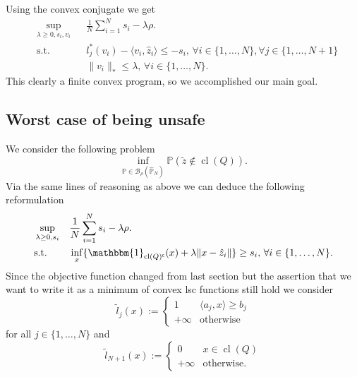\documentclass{scrartcl}
\renewcommand{\P}{\mathbb{P}}
\DeclareMathOperator*{\cl}{cl}
\newcommand{\ball}{\mathcal{B}}
\begin{document}
Using the convex conjugate we get
\begin{equation*}
  \begin{aligned}
    & \sup_{\lambda \ge 0, s_i,v_i} & & \frac{1}{N} \sum_{i=1}^N s_i - \lambda\rho. \\
    & \text{s.t.} & & l_j^*(v_i) - \langle {v_i, \hat{z}_i} \rangle \le - s_i, \, \forall i \in \{1,\dots,N\}, \forall j \in \{1,\dots,N+1\} \\
    & & & \lVert {v_i} \rVert_*\le\lambda, \, \forall i \in \{1,\dots,N\}.
  \end{aligned}
\end{equation*}
This clearly a finite convex program, so we accomplished our main goal.

\subsection*{Worst case of being unsafe}
\label{sec:unsafe}
We consider the following problem
\begin{equation}
  \label{eq:op_unsafe}
  \inf_{\P \in \ball_{\rho}(\hat{\P}_{N})} \P \left( \tilde{z} \not\in \cl(Q) \right).
\end{equation}
Via the same lines of reasoning as above we can deduce the following reformulation
\begin{equation}
  \label{eq:reform_copy}
  \begin{aligned}
    & \sup_{\lambda \ge 0, s_i} & & \frac{1}{N} \sum_{i=1}^N s_i - \lambda\rho. \\
    & \text{s.t.} & & \inf_{x} \{ \mathbbm{1}_{\cl(Q)^{\mathsf{c}}}(x) + \lambda \lVert x-\hat{z}_i \rVert \} \geq s_i, \, \forall i \in \{1,\dots,N\}.
  \end{aligned}
\end{equation}
Since the objective function changed from last section but the assertion that we
want to write it as a minimum of convex lsc functions still hold we consider
\begin{equation*}
 \tilde{l}_j(x) :=
 \begin{cases}
   1 & \langle {a_j, x} \rangle \geq b_j \\
   +\infty & \text{otherwise}
 \end{cases}
\end{equation*}
for all $j \in \{1,\dots,N\}$ and
\begin{equation*}
  \tilde{l}_{N+1}(x) :=
  \begin{cases}
    0 & x \in \cl (Q) \\
    +\infty & \text{otherwise.}
  \end{cases}
\end{equation*}
\end{document}
